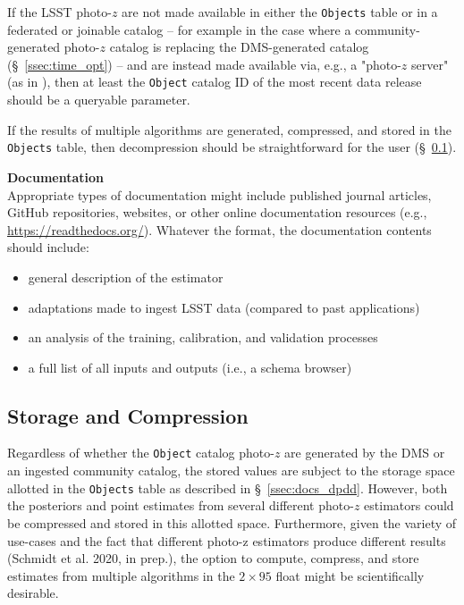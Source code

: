 \documentclass[DM,lsstdraft,toc]{lsstdoc}
\begin{document}
If the LSST photo-$z$ are not made available in either the {\tt Objects} table or in a federated or joinable catalog -- for example in the case where a community-generated photo-$z$ catalog is replacing the DMS-generated catalog (\S~\ref{ssec:time_opt}) -- and are instead made available via, e.g., a "photo-$z$ server" (as in \cite{2018A&C....25...58G}), then at least the {\tt Object} catalog ID of the most recent data release should be a queryable parameter.

If the results of multiple algorithms are generated, compressed, and stored in the {\tt Objects} table, then decompression should be straightforward for the user (\S~\ref{ssec:dp_store}).

{\bf Documentation}\\
Appropriate types of documentation might include published journal articles, GitHub repositories, websites, or other online documentation resources (e.g., \url{https://readthedocs.org/}). Whatever the format, the documentation contents should include: 
\vspace{-15pt}
\begin{itemize}
\item general description of the estimator
\item adaptations made to ingest LSST data (compared to past applications)
\item an analysis of the training, calibration, and validation processes
\item a full list of all inputs and outputs (i.e., a schema browser)
\end{itemize}

\subsection{Storage and Compression}\label{ssec:dp_store}

Regardless of whether the {\tt Object} catalog photo-$z$ are generated by the DMS or an ingested community catalog, the stored values are subject to the storage space allotted in the {\tt Objects} table as described in \S~\ref{ssec:docs_dpdd}.
However, both the posteriors and point estimates from several different photo-$z$ estimators could be compressed and stored in this allotted space.
Furthermore, given the variety of use-cases and the fact that different photo-z estimators produce different results (Schmidt et al. 2020, in prep.), the option to compute, compress, and store estimates from multiple algorithms in the $2\times95$ float might be scientifically desirable.
\end{document}
